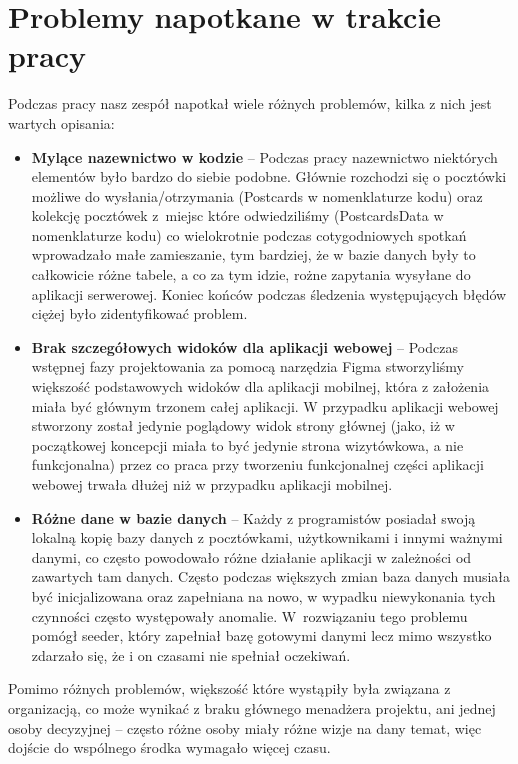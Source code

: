 \documentclass[a4paper,twoside,12pt]{book}
\begin{document}
\section{Problemy napotkane w trakcie pracy}
Podczas pracy nasz zespół napotkał wiele różnych problemów, kilka z nich jest wartych opisania:
\begin{itemize}
    \item \textbf{Mylące nazewnictwo w kodzie} -- Podczas pracy nazewnictwo niektórych elementów było bardzo do siebie podobne. Głównie rozchodzi się o pocztówki możliwe do wysłania/otrzymania (Postcards w nomenklaturze kodu) oraz kolekcję pocztówek z~miejsc które odwiedziliśmy (PostcardsData w nomenklaturze kodu) co wielokrotnie podczas cotygodniowych spotkań wprowadzało małe zamieszanie, tym bardziej, że w bazie danych były to całkowicie różne tabele, a co za tym idzie, rożne zapytania wysyłane do aplikacji serwerowej. Koniec końców podczas śledzenia występujących błędów ciężej było zidentyfikować problem.
    \item \textbf{Brak szczegółowych widoków dla aplikacji webowej} -- Podczas wstępnej fazy projektowania za pomocą narzędzia Figma stworzyliśmy większość podstawowych widoków dla aplikacji mobilnej, która z założenia miała być głównym trzonem całej aplikacji. W przypadku aplikacji webowej stworzony został jedynie poglądowy widok strony głównej (jako, iż w początkowej koncepcji miała to być jedynie strona wizytówkowa, a nie funkcjonalna) przez co praca przy tworzeniu funkcjonalnej części aplikacji webowej trwała dłużej niż w przypadku aplikacji mobilnej.
    \item \textbf{Różne dane w bazie danych} -- Każdy z programistów posiadał swoją lokalną kopię bazy danych z pocztówkami, użytkownikami i innymi ważnymi danymi, co często powodowało różne działanie aplikacji w zależności od zawartych tam danych. Często podczas większych zmian baza danych musiała być inicjalizowana oraz zapełniana na nowo, w wypadku niewykonania tych czynności często występowały anomalie. W~rozwiązaniu tego problemu pomógł seeder, który zapełniał bazę gotowymi danymi lecz mimo wszystko zdarzało się, że i on czasami nie spełniał oczekiwań.
\end{itemize}
Pomimo różnych problemów, większość które wystąpiły była związana z organizacją, co może wynikać z braku głównego menadżera projektu, ani jednej osoby decyzyjnej -- często różne osoby miały różne wizje na dany temat, więc dojście do wspólnego środka wymagało więcej czasu.

\newpage
\end{document}
